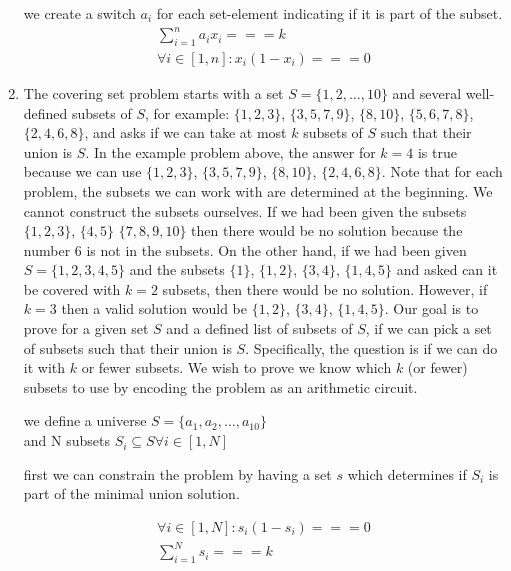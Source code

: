 \documentclass{article}
\begin{document}
\begin{enumerate}
    we create a switch $a_i$ for each set-element indicating if it is part of the subset.
    \begin{align*}
          \sum_{i=1}^n a_i x_i === k \\
          \forall i \in [1, n]: x_i(1-x_i) === 0
     \end{align*}

    \item The covering set problem starts with a set $S = \{1, 2, \ldots, 10\}$ and several well-defined subsets of $S$, for example: $\{1, 2, 3\}$, $\{3, 5, 7, 9\}$, $\{8, 10\}$, $\{5, 6, 7, 8\}$, $\{2, 4, 6, 8\}$, and asks if we can take at most $k$ subsets of $S$ such that their union is $S$. In the example problem above, the answer for $k = 4$ is true because we can use $\{1, 2, 3\}$, $\{3, 5, 7, 9\}$, $\{8, 10\}$, $\{2, 4, 6, 8\}$. Note that for each problem, the subsets we can work with are determined at the beginning. We cannot construct the subsets ourselves. If we had been given the subsets $\{1,2,3\}$, $\{4,5\}$ $\{7,8,9,10\}$ then there would be no solution because the number $6$ is not in the subsets.
     On the other hand, if we had been given $S = \{1,2,3,4,5\}$ and the subsets $\{1\}$, $\{1,2\}$, $\{3, 4\}$, $\{1, 4, 5\}$ and asked can it be covered with $k = 2$ subsets, then there would be no solution. However, if $k = 3$ then a valid solution would be $\{1, 2\}$, $\{3, 4\}$, $\{1, 4, 5\}$.
     Our goal is to prove for a given set $S$ and a defined list of subsets of $S$, if we can pick a set of subsets such that their union is $S$. Specifically, the question is if we can do it with $k$ or fewer subsets. We wish to prove we know which $k$ (or fewer) subsets to use by encoding the problem as an arithmetic circuit.

     we define a universe $S = \{a_1, a_2, \ldots, a_10\}$\\
     and N subsets $S_i \subseteq S \forall i \in [1, N]$
     
     first we can constrain the problem by having a set $s$ which determines if $S_i$  is part of the minimal union solution.

     \begin{align*}
          \forall i \in [1, N]: s_i(1-s_i) === 0 \\
          \sum_{i=1}^N s_i === k \\
     \end{align*}


\end{enumerate}
\end{document}
